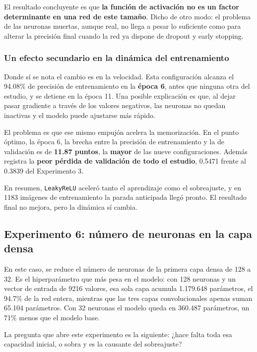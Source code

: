 \documentclass[11pt, a4paper]{article}
\begin{document}
El resultado concluyente es que \textbf{la función de activación no es un factor determinante en una red de este tamaño}. Dicho de otro modo: el problema de las neuronas muertas, aunque real, no llega a pesar lo suficiente como para alterar la precisión final cuando la red ya dispone de dropout y early stopping.

\subsubsection{Un efecto secundario en la dinámica del entrenamiento}

Donde sí se nota el cambio es en la velocidad. Esta configuración alcanza el 94.08\% de precisión de entrenamiento en la \textbf{época 6}, antes que ninguna otra del estudio, y se detiene en la época 11. Una posible explicación es que, al dejar pasar gradiente a través de los valores negativos, las neuronas no quedan inactivas y el modelo puede ajustarse más rápido.

El problema es que ese mismo empujón acelera la memorización. En el punto óptimo, la época 6, la brecha entre la precisión de entrenamiento y la de validación es de \textbf{11.87 puntos}, la \textbf{mayor} de las nueve configuraciones. Además registra la \textbf{peor pérdida de validación de todo el estudio}, 0.5471 frente al 0.3839 del Experimento 3.

En resumen, \texttt{LeakyReLU} aceleró tanto el aprendizaje como el sobreajuste, y en 1183 imágenes de entrenamiento la parada anticipada llegó pronto. El resultado final no mejora, pero la dinámica sí cambia.

\subsection{Experimento 6: número de neuronas en la capa densa}

En este caso, se reduce el número de neuronas de la primera capa densa de 128 a 32. Es el hiperparámetro que más pesa en el modelo: con 128 neuronas y un vector de entrada de 9216 valores, esa sola capa acumula 1.179.648 parámetros, el 94.7\% de la red entera, mientras que las tres capas convolucionales apenas suman 65.104 parámetros. Con 32 neuronas el modelo queda en 360.487 parámetros, un 71\% menos que el modelo base.

La pregunta que abre este experimento es la siguiente: ¿hace falta toda esa capacidad inicial, o sobra y es la causante del sobreajuste?
\end{document}
